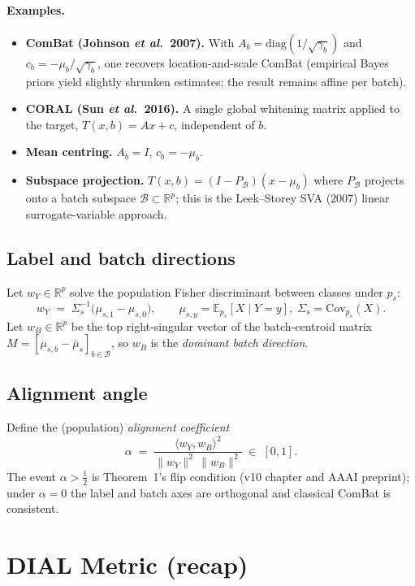 \documentclass[11pt,a4paper]{article}
\newcommand{\R}{\mathbb{R}}
\newcommand{\E}{\mathbb{E}}
\begin{document}
\paragraph{Examples.}
\begin{itemize}
\item \textbf{ComBat (Johnson \emph{et al.}\ 2007).} With
  $A_b = \mathrm{diag}(1/\sqrt{\gamma_b})$ and
  $c_b = -\mu_b/\sqrt{\gamma_b}$, one recovers location-and-scale
  ComBat (empirical Bayes priors yield slightly shrunken estimates; the
  result remains affine per batch).
\item \textbf{CORAL (Sun \emph{et al.}\ 2016).} A single global
  whitening matrix applied to the target, $T(x,b)=A x+c$, independent
  of $b$.
\item \textbf{Mean centring.} $A_b=I$, $c_b=-\mu_b$.
\item \textbf{Subspace projection.} $T(x,b)=(I-P_{\mathcal{B}})(x-\mu_b)$
  where $P_{\mathcal{B}}$ projects onto a batch subspace
  $\mathcal{B}\subset\R^{p}$; this is the Leek--Storey SVA (2007) linear
  surrogate-variable approach.
\end{itemize}

\subsection{Label and batch directions}

Let $w_Y\in\R^{p}$ solve the population Fisher discriminant between
classes under $p_s$:
\[
  w_Y \;=\; \Sigma_s^{-1}\bigl(\mu_{s,1}-\mu_{s,0}\bigr),
  \qquad
  \mu_{s,y}=\E_{p_s}[X\mid Y=y],\;
  \Sigma_s=\mathrm{Cov}_{p_s}(X).
\]
Let $w_B\in\R^{p}$ be the top right-singular vector of the
batch-centroid matrix $M=[\mu_{s,b}-\bar\mu_s]_{b\in\mathcal{B}}$, so
$w_B$ is the \emph{dominant batch direction}.

\subsection{Alignment angle}

Define the (population) \emph{alignment coefficient}
\[
  \alpha \;=\; \frac{\langle w_Y, w_B\rangle^{2}}
                    {\|w_Y\|^{2}\,\|w_B\|^{2}} \;\in\;[0,1].
\]
The event $\alpha>\tfrac12$ is Theorem~1's flip condition (v10 chapter
and AAAI preprint); under $\alpha=0$ the label and batch axes are
orthogonal and classical ComBat is consistent.

\section{DIAL Metric (recap)}
\end{document}
